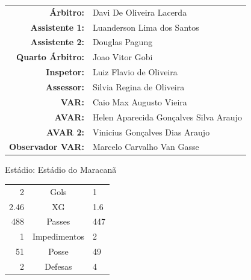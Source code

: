 \documentclass[11pt]{article}
\newcommand{\teamjersey}{}
\begin{document}
\vspace{0.5cm}
\begin{minipage}{0.65\textwidth}
\begin{center}
\begin{tabular}{rl}
\textbf{Árbitro:} & Davi De Oliveira Lacerda \\
\textbf{Assistente 1:} & Luanderson Lima dos Santos \\
\textbf{Assistente 2:} & Douglas Pagung \\
\textbf{Quarto Árbitro:} & Joao Vitor Gobi \\
\textbf{Inspetor:} & Luiz Flavio de Oliveira \\
\textbf{Assessor:} & Silvia Regina de Oliveira \\
\textbf{VAR:} & Caio Max Augusto Vieira \\
\textbf{AVAR:} & Helen Aparecida Gonçalves Silva Araujo \\
\textbf{AVAR 2:} & Vinicius Gonçalves Dias Araujo \\
\textbf{Observador VAR:} & Marcelo Carvalho Van Gasse \\
\end{tabular}
\end{center}
\end{minipage}
\begin{minipage}{0.3\textwidth}
Estádio: Estádio do Maracanã\\
\begin{tabular}{rcl}
2 & Gols & 1 \\
2.46 & XG & 1.6 \\
488 & Passes & 447 \\
1 & Impedimentos & 2 \\
51 & Posse & 49 \\
2 & Defesas & 4 \\
\end{tabular}
\end{minipage}
\newpage
\vspace{0.5cm}
\renewcommand{\teamjersey}{../assets/camisa/costas1.png}
\end{document}
